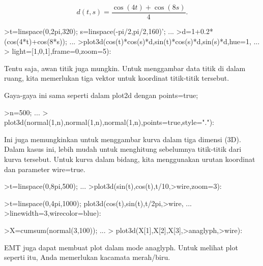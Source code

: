 \documentclass{article}
\begin{document}
\begin{eulernotebook}
\begin{eulercomment}
\end{eulercomment}
\begin{eulerformula}
\[
d(t,s) = \frac{\cos(4t)+\cos(8s)}{4}.
\]
\end{eulerformula}
\begin{eulerprompt}
>t=linspace(0,2pi,320); s=linspace(-pi/2,pi/2,160)'; ...
>d=1+0.2*(cos(4*t)+cos(8*s)); ...
>plot3d(cos(t)*cos(s)*d,sin(t)*cos(s)*d,sin(s)*d,hue=1, ...
>  light=[1,0,1],frame=0,zoom=5):
\end{eulerprompt}
\begin{eulercomment}
Tentu saja, awan titik juga mungkin. Untuk menggambar data titik di
dalam ruang, kita memerlukan tiga vektor untuk koordinat titik-titik
tersebut.

Gaya-gaya ini sama seperti dalam plot2d dengan points=true;
\end{eulercomment}
\begin{eulerprompt}
>n=500;  ...
>  plot3d(normal(1,n),normal(1,n),normal(1,n),points=true,style="."):
\end{eulerprompt}
\begin{eulercomment}
Ini juga memungkinkan untuk menggambar kurva dalam tiga dimensi (3D).
Dalam kasus ini, lebih mudah untuk menghitung sebelumnya titik-titik
dari kurva tersebut. Untuk kurva dalam bidang, kita menggunakan urutan
koordinat dan parameter wire=true.
\end{eulercomment}
\begin{eulerprompt}
>t=linspace(0,8pi,500); ...
>plot3d(sin(t),cos(t),t/10,>wire,zoom=3):
\end{eulerprompt}
\begin{eulerprompt}
>t=linspace(0,4pi,1000); plot3d(cos(t),sin(t),t/2pi,>wire, ...
>linewidth=3,wirecolor=blue):
\end{eulerprompt}
\begin{eulerprompt}
>X=cumsum(normal(3,100)); ...
> plot3d(X[1],X[2],X[3],>anaglyph,>wire):
\end{eulerprompt}
\begin{eulercomment}
EMT juga dapat membuat plot dalam mode anaglyph. Untuk melihat plot
seperti itu, Anda memerlukan kacamata merah/biru.
\end{eulercomment}
\begin{eulerprompt}

\end{eulerprompt}
\end{eulernotebook}
\end{document}
